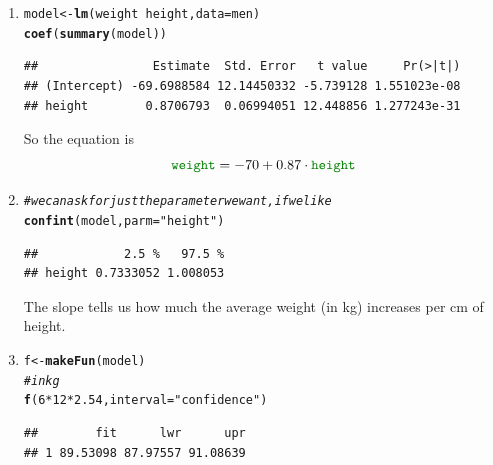 \documentclass[twoside]{book}
\makeatletter
\newcommand{\hlnum}[1]{\textcolor[rgb]{0.686,0.059,0.569}{#1}}%
\newcommand{\hlstr}[1]{\textcolor[rgb]{0.192,0.494,0.8}{#1}}%
\newcommand{\hlcom}[1]{\textcolor[rgb]{0.678,0.584,0.686}{\textit{#1}}}%
\newcommand{\hlopt}[1]{\textcolor[rgb]{0,0,0}{#1}}%
\newcommand{\hlstd}[1]{\textcolor[rgb]{0.345,0.345,0.345}{#1}}%
\newcommand{\hlkwb}[1]{\textcolor[rgb]{0.69,0.353,0.396}{#1}}%
\newcommand{\hlkwc}[1]{\textcolor[rgb]{0.333,0.667,0.333}{#1}}%
\newcommand{\hlkwd}[1]{\textcolor[rgb]{0.737,0.353,0.396}{\textbf{#1}}}%
\newenvironment{kframe}{%
 \def\at@end@of@kframe{}%
 \ifinner\ifhmode%
  \def\at@end@of@kframe{\end{minipage}}%
  \begin{minipage}{\columnwidth}%
 \fi\fi%
 \def\FrameCommand##1{\hskip\@totalleftmargin \hskip-\fboxsep
 \colorbox{shadecolor}{##1}\hskip-\fboxsep
     \hskip-\linewidth \hskip-\@totalleftmargin \hskip\columnwidth}%
 \MakeFramed {\advance\hsize-\width
   \@totalleftmargin\z@ \linewidth\hsize
   \@setminipage}}%
 {\par\unskip\endMakeFramed%
 \at@end@of@kframe}
\newenvironment{knitrout}{}{} %
\newcommand{\variable}[1]{{\color{green!50!black}\texttt{#1}}}
\makeatother
\begin{document}
\begin{solution}
	\begin{enumerate}
		\item
\begin{knitrout}
\color{fgcolor}\begin{kframe}
\begin{alltt}
\hlstd{model} \hlkwb{<-} \hlkwd{lm}\hlstd{(weight} \hlopt{~} \hlstd{height,} \hlkwc{data} \hlstd{= men)}
\hlkwd{coef}\hlstd{(}\hlkwd{summary}\hlstd{(model))}
\end{alltt}
\begin{verbatim}
##                Estimate  Std. Error   t value     Pr(>|t|)
## (Intercept) -69.6988584 12.14450332 -5.739128 1.551023e-08
## height        0.8706793  0.06994051 12.448856 1.277243e-31
\end{verbatim}
\end{kframe}
\end{knitrout}
			So the equation is 
			\[
			\variable{weight} = 
			\ensuremath{-70} + 
			0.87 \cdot \variable{height}
			\]
		\item
\begin{knitrout}
\color{fgcolor}\begin{kframe}
\begin{alltt}
\hlcom{# we can ask for just the parameter we want, if we like}
\hlkwd{confint}\hlstd{(model,} \hlkwc{parm} \hlstd{=} \hlstr{"height"}\hlstd{)}
\end{alltt}
\begin{verbatim}
##            2.5 %   97.5 %
## height 0.7333052 1.008053
\end{verbatim}
\end{kframe}
\end{knitrout}
The slope tells us how much the average weight (in kg) increases per 
cm of height.
		\item
\begin{knitrout}
\color{fgcolor}\begin{kframe}
\begin{alltt}
\hlstd{f} \hlkwb{<-} \hlkwd{makeFun}\hlstd{(model)}
\hlcom{# in kg}
\hlkwd{f}\hlstd{(}\hlnum{6} \hlopt{*} \hlnum{12} \hlopt{*} \hlnum{2.54}\hlstd{,} \hlkwc{interval} \hlstd{=} \hlstr{"confidence"}\hlstd{)}
\end{alltt}
\begin{verbatim}
##        fit      lwr      upr
## 1 89.53098 87.97557 91.08639

\end{verbatim}
\end{kframe}
\end{knitrout}
\end{enumerate}
\end{solution}
\end{document}
